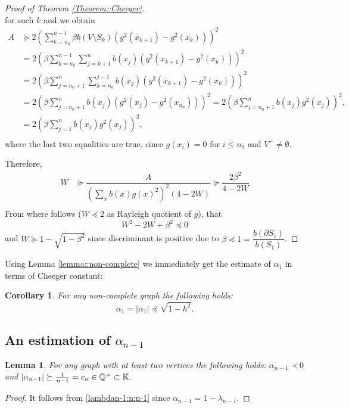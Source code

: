 \documentclass[a4paper,12pt]{amsart}
\newtheorem{lemma}{Lemma}
\newtheorem{corollary}{Corollary}
\theoremstyle{definition}
\newcommand{\K}{\mathbb{K}}
\newcommand{\weight}{b}
\begin{document}
\begin{proof}[Proof of Theorem \ref{Theorem::Cheeger}]
$$$$
for such $k$ and we obtain
\begin{align*}
A&\succeq 2 \left(\sum_{k=n_0}^{n-1}\beta \weight(V\setminus S_k)(g^2(x_{k+1})-g^2(x_k))\right)^2\\
&= 2 \left(\beta\sum_{k=n_0}^{n-1}\sum_{j=k+1}^n \weight (x_j)(g^2(x_{k+1})-g^2(x_k))\right)^2\\
&= 2 \left(\beta\sum_{j=n_0+1}^{n}\sum_{k=n_0}^{j-1} \weight (x_j)(g^2(x_{k+1})-g^2(x_k))\right)^2\\
&= 2 \left(\beta\sum_{j=n_0+1}^{n}\weight (x_j)(g^2(x_{j})-g^2(x_{n_0}))\right)^2= 2 \left(\beta\sum_{j=n_0+1}^{n}\weight (x_j)g^2(x_{j})\right)^2,\\
&= 2 \left(\beta\sum_{j=1}^{n}\weight (x_j)g^2(x_{j})\right)^2,\\
\end{align*}
where the last two equalities are true, since $g(x_i)=0$ for $i\le n_0$ and $V^-\ne \emptyset$.

Therefore,
\begin{align*}
W&\succeq \dfrac{A}{\left(\sum_x \weight (x)g(x)^2\right)^2 (4-2W)}\succeq \dfrac{2\beta^2}{4-2W}\\
\end{align*}
From where follows ($W\preceq 2$ as Rayleigh quotient of $g$), that
$$
W^2-2W+\beta^2\preceq 0
$$
and 
$W\succeq 1-\sqrt{1-\beta^2}$ since discriminant is positive due to $\beta\preceq 1=\dfrac{\weight(\partial S_1)}{\weight(S_1)}$.

\end{proof}
Using Lemma \ref{lemma::non-complete} we immediately get the estimate of $\alpha_1$ in terms of Cheeger constant:
\begin{corollary}\label{cor::Cheegeralpha}
For any  non-complete graph the following holds:
$$\alpha_1=|\alpha_1|\preceq \sqrt{1-h^2}.$$
\end{corollary}

\subsection{An estimation of $\alpha_{n-1}$}


\begin{lemma}\label{aaa} For any graph with at least two vertices  the following holds:
$\alpha_{n-1}\prec 0$ and $|\alpha_{n-1}|\succeq \frac{1}{n-1}=c_n\in \Bbb Q^+\subset \K$.
\end{lemma}
\begin{proof}
It follows from \eqref{lambdan-1:n:n-1} since $\alpha_{n-1}=1-\lambda_{n-1}$.
\end{proof}
\end{document}
